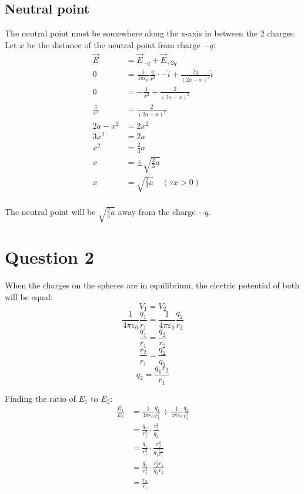 \documentclass[11pt]{article}
\begin{document}
\newpage

\subsection{Neutral point}
\label{sec:org9c43e57}
The neutral point must be somewhere along the x-axis in between the 2 charges.
\\[0pt]

Let \(x\) be the distance of the neutral point from charge \(-q\):
\begin{align*}
\vec{E} &= \vec{E}_{-q} + \vec{E}_{+2q} \\
0 &= \frac{1}{4 \pi \varepsilon_0} \frac{q}{x^2} \cdot -\hat{i} + \frac{2q}{(2a - x)^2} \hat{i} \\
0 &= -\frac{1}{x^2} + \frac{2}{(2a - x)^2} \\
\frac{1}{x^2} &= \frac{2}{(2a - x)^2} \\
2a - x^2 &= 2x^2 \\
3x^2 &= 2a \\
x^2 &= \frac{2}{3} a \\
x &= \pm \sqrt{\frac{2}{3} a} \\
x &= \sqrt{\frac{2}{3} a} \quad (\because x > 0) \\
\end{align*}

The neutral point will be \(\sqrt{\frac{2}{3}a}\) away from the charge \(-q\).

\newpage


\section{Question 2}
\label{sec:org13cb2c8}
When the charges on the spheres are in equilibrium, the electric potential of both will be equal:
\[V_1 = V_2\]
\[\frac{1}{4 \pi \varepsilon_0} \frac{q_1}{r_1} = \frac{1}{4 \pi \varepsilon_0} \frac{q_2}{r_2}\]
\[\frac{q_1}{r_1} = \frac{q_2}{r_2}\]
\[\frac{r_2}{r_1} = \frac{q_2}{q_1}\]
\[q_2 = \frac{q_1 r_2}{r_1}\]

Finding the ratio of \(E_1\) to \(E_2\):
\begin{align*}
\frac{E_1}{E_2} &= \frac{1}{4 \pi \varepsilon_0} \frac{q_1}{r_1^2} \div \frac{1}{4 \pi \varepsilon_0} \frac{q_2}{r_2^2} \\
&= \frac{q_1}{r_1^2} \cdot \frac{r_2^2}{q_2} \\
&= \frac{q_1}{r_1^2} \cdot \frac{r_2^2}{q_1 \frac{r_2}{r_1}} \\
&= \frac{q_1}{r_1^2} \cdot \frac{r_2^2 r_1}{q_1 r_2} \\
&= \frac{r_2}{r_1} \\
\end{align*}
\end{document}
